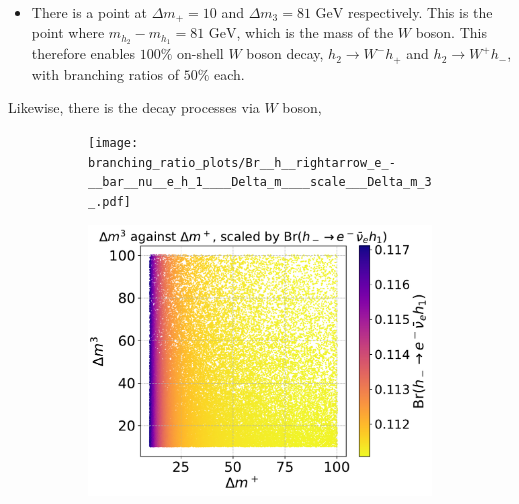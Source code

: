 \documentclass[12pt]{article}
\begin{document}
\begin{itemize}
    \item There is a point at $\Delta m_+= 10$ and $\Delta m_3=81 \text{ GeV}$ respectively. This is the point where $m_{h_2} - m_{h_1} = 81 \text{ GeV}$, which is the mass of the $W$ boson. This therefore enables $100\%$ on-shell $W$ boson decay, $h_2 \rightarrow W^- h_+$ and $h_2 \rightarrow W^+ h_-$, with branching ratios of $50\%$ each. 
\end{itemize}

Likewise, there is the decay processes via $W$ boson,  
\begin{figure}[H]
    \centering
    \begin{subfigure}[b]{0.49\textwidth}
        \texttt{[image: branching\_ratio\_plots/Br\_\_h\_\_rightarrow\_e\_-\_\_bar\_\_nu\_\_e\_h\_1\_\_\_\_Delta\_m\_\_\_\_scale\_\_\_Delta\_m\_3\_.pdf]}
        \caption{}
        \label{fig:Br(h2ee),Dm3_scale}
    \end{subfigure}
    \hfill
    \begin{subfigure}[b]{0.49\textwidth}
        \includegraphics[width=\textwidth]{branching_ratio_plots/__Delta_m_3___Delta_m____scale_Br__h_-__rightarrow_e_-__bar__nu__e_h_1__.pdf}
        \caption{}
        \label{fig:Br(h2ee),Br_scale}
    \end{subfigure}
    \\
    \begin{subfigure}[b]{0.49\textwidth}

\end{subfigure}
\end{figure}
\end{document}
